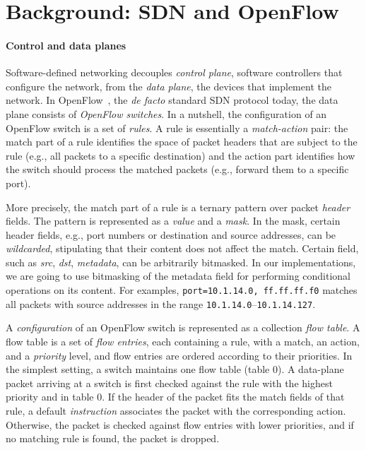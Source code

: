 \documentclass[conference]{sigcomm-alternate}
\newcommand{\liron}[1]{\textit{\textcolor{mygreen}{[liron]: #1}}} %
\newcommand{\petr}[1]{\textit{\textcolor{blue}{[petr]: #1}}} %
\begin{document}
\section{Background: SDN and OpenFlow}\label{sec:background}


\paragraph{Control and data planes}
Software-defined networking decouples \emph{control plane}, software
controllers that configure the network, from the \emph{data plane}, the
devices that implement the network.  
% 
In OpenFlow~\cite{of-spec}, the \emph{de facto} standard SDN protocol
today, the data plane consists of \emph{OpenFlow switches}. 
In a nutshell, the configuration of an OpenFlow switch is a set of
\emph{rules}. 
A rule is essentially a \emph{match-action} pair:
the match part of a rule identifies the space of packet headers that are
subject to the rule (e.g., all packets to a specific destination) and
the action part identifies how the switch should process the matched
packets (e.g., forward them to a specific port).

More precisely, the match part of a rule is 
a ternary pattern over packet \emph{header} fields.
The pattern is represented as a \emph{value} and a \emph{mask}. 
In the mask, certain header fields, e.g., port numbers or destination and source
addresses, can be \emph{wildcarded}, stipulating that their content does
not affect the match. 
Certain field, such as \emph{src}, \emph{dst}, \emph{metadata}, can be arbitrarily
bitmasked. 
In our implementations, we are going to use bitmasking of the metadata
field for performing conditional operations on  its content.   
For examples, \texttt{port=10.1.14.0, ff.ff.ff.f0} matches all packets
with source addresses in the range \texttt{10.1.14.0}--\texttt{10.1.14.127}.

A \emph{configuration} of an OpenFlow switch is represented as a
collection \emph{flow table}.
A flow table is a set of \emph{flow entries}, each containing a rule,
with a match, an action, and a \emph{priority} level, and flow entries
are ordered according to their priorities.  
In the simplest setting, a switch maintains one flow table (table 0).  
A data-plane packet arriving at a switch is first checked against
the rule with the highest priority and in table $0$. 
If the header of the packet fits the match fields of that rule, 
a default \emph{instruction} associates the packet with the corresponding action.
Otherwise, the packet is checked against flow  entries with lower
priorities, and if no matching rule is found, the packet is dropped.
\end{document}
